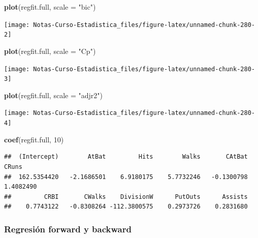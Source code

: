 \documentclass[
  12pt,
]{book}
\newenvironment{Shaded}{\begin{snugshade}}{\end{snugshade}}
\newcommand{\DataTypeTok}[1]{\textcolor[rgb]{0.13,0.29,0.53}{#1}}
\newcommand{\DecValTok}[1]{\textcolor[rgb]{0.00,0.00,0.81}{#1}}
\newcommand{\KeywordTok}[1]{\textcolor[rgb]{0.13,0.29,0.53}{\textbf{#1}}}
\newcommand{\NormalTok}[1]{#1}
\newcommand{\StringTok}[1]{\textcolor[rgb]{0.31,0.60,0.02}{#1}}
\theoremstyle{definition}
\theoremstyle{definition}
\theoremstyle{definition}
\theoremstyle{remark}
\begin{document}
\begin{Shaded}
\begin{Highlighting}[]
\KeywordTok{plot}\NormalTok{(regfit.full, }\DataTypeTok{scale =} \StringTok{"bic"}\NormalTok{)}
\end{Highlighting}
\end{Shaded}

\begin{center}\texttt{[image: Notas-Curso-Estadistica\_files/figure-latex/unnamed-chunk-280-2]} \end{center}

\begin{Shaded}
\begin{Highlighting}[]
\KeywordTok{plot}\NormalTok{(regfit.full, }\DataTypeTok{scale =} \StringTok{"Cp"}\NormalTok{)}
\end{Highlighting}
\end{Shaded}

\begin{center}\texttt{[image: Notas-Curso-Estadistica\_files/figure-latex/unnamed-chunk-280-3]} \end{center}

\begin{Shaded}
\begin{Highlighting}[]
\KeywordTok{plot}\NormalTok{(regfit.full, }\DataTypeTok{scale =} \StringTok{"adjr2"}\NormalTok{)}
\end{Highlighting}
\end{Shaded}

\begin{center}\texttt{[image: Notas-Curso-Estadistica\_files/figure-latex/unnamed-chunk-280-4]} \end{center}

\begin{Shaded}
\begin{Highlighting}[]
\KeywordTok{coef}\NormalTok{(regfit.full, }\DecValTok{10}\NormalTok{)}
\end{Highlighting}
\end{Shaded}

\begin{verbatim}
##  (Intercept)        AtBat         Hits        Walks       CAtBat        CRuns 
##  162.5354420   -2.1686501    6.9180175    5.7732246   -0.1300798    1.4082490 
##         CRBI       CWalks    DivisionW      PutOuts      Assists 
##    0.7743122   -0.8308264 -112.3800575    0.2973726    0.2831680
\end{verbatim}

\hypertarget{regresiuxf3n-forward-y-backward}{%
\subsubsection{Regresión forward y backward}\label{regresiuxf3n-forward-y-backward}}
\end{document}
